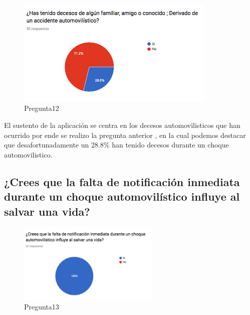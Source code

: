 \begin{figure}[htbp!]
	\begin{center}
		\includegraphics[width=0.85\textwidth]{DisenoEstructura/imagenes/Pregunta12}
		\caption{Pregunta12}
		\label{DE/FO/Pregunta12}
	\end{center}
\end{figure}

El sustento de la aplicación se centra en los decesos automovilisticos que han ocurrido por ende se realizo la pregunta anterior , en la cual podemos destacar que desafortunadamente un 28.8\% han tenido decesos durante un choque automovilistico.\\

\subsection{¿Crees que la falta de notificación inmediata durante un choque automovilístico influye al salvar una vida?}

\begin{figure}[htbp!]
	\begin{center}
		\includegraphics[width=0.6\textwidth]{DisenoEstructura/imagenes/Pregunta13}
		\caption{Pregunta13}
		\label{DE/FO/Pregunta13}
	\end{center}
\end{figure}

